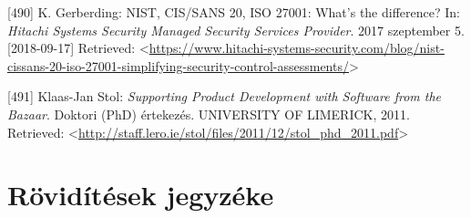 \documentclass[12pt,magyar,a4paper,oneside]{scrreprt}
\newenvironment{cslreferences}%
  {}%
  {\par}
\begin{document}
\begin{cslreferences}
\leavevmode\hypertarget{ref-gerberding_nist_2017}{}%
{[}490{]} K. Gerberding: NIST, CIS/SANS 20, ISO 27001: What's the
difference? In: \emph{Hitachi Systems Security \textbar{} Managed
Security Services Provider}. 2017 szeptember 5. {[}2018-09-17{]}
Retrieved:
\textless{}\url{https://www.hitachi-systems-security.com/blog/nist-cissans-20-iso-27001-simplifying-security-control-assessments/}\textgreater{}

\leavevmode\hypertarget{ref-klaas-jan_stol_supporting_2011}{}%
{[}491{]} Klaas-Jan Stol: \emph{Supporting Product Development with
Software from the Bazaar}. Doktori (PhD) értekezés. UNIVERSITY OF
LIMERICK, 2011. Retrieved:
\textless{}\url{http://staff.lero.ie/stol/files/2011/12/stol_phd_2011.pdf}\textgreater{}
\end{cslreferences}

\newpage

\hypertarget{ruxf6viduxedtuxe9sek-jegyzuxe9ke}{%
\chapter*{Rövidítések jegyzéke}\label{ruxf6viduxedtuxe9sek-jegyzuxe9ke}}
\end{document}
